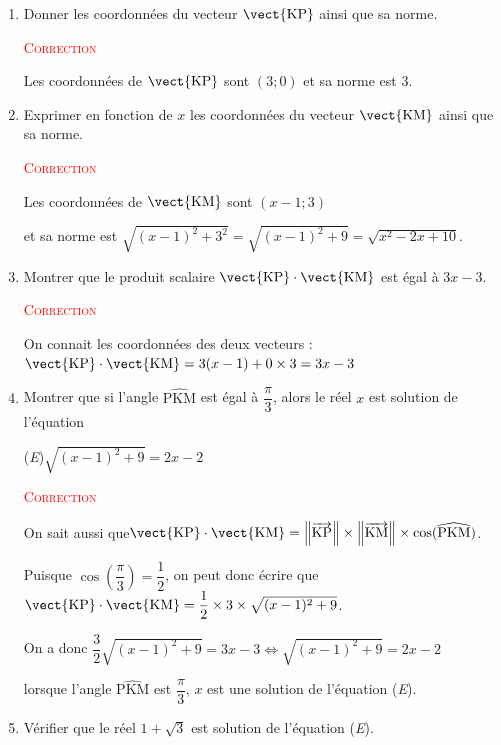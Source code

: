 \begin{enumerate}
	\item Donner les coordonnées du vecteur \mbox{$\vect{\text{KP}}$} ainsi que sa norme.


	\textcolor{red}{\textsc{Correction}}


	Les coordonnées de $\vect{\text{KP}}$ sont 	\mbox{$(3;0)$}
	 et sa norme est $3$.
	\item Exprimer en fonction de $x$ les coordonnées du vecteur \mbox{$\vect{\text{KM}}$} ainsi que sa norme.




	\textcolor{red}{\textsc{Correction}}


	Les coordonnées de $\vect{\text{KM}}$ sont \mbox{$(x-1;3)$}

	et sa norme est \quad \mbox{$\sqrt{(x-1)^2+3^2}=\sqrt{(x-1)^2+9}=\sqrt{x^2-2x+10}$}.

	\item Montrer que le produit scalaire \mbox{$\vect{\text{KP}}\cdot\vect{\text{KM}}$} est égal à \mbox{$3x-3$.}

		\textcolor{red}{\textsc{Correction}}

		On connait les coordonnées des deux vecteurs : \quad \mbox{$\vect{\text{KP}}\cdot\vect{\text{KM}}=3(x-1)+0\times3=3x-3$}
	\item Montrer que si l'angle \ensuremath{\widehat{\text{PKM}}} est égal à \mbox{$\dfrac\pi 3$}, alors le réel $x$ est solution de l'équation

	\begin{center}
		(\textit{E})\hspace{10mm}\mbox{$\sqrt{(x-1)^2+9}=2x-2$}
	\end{center}



	\textcolor{red}{\textsc{Correction}}

	On sait aussi que\quad  \mbox{$\vect{\text{KP}}\cdot\vect{\text{KM}}=\left\|\overrightarrow{\text{KP}}\right\|\times\left\|\overrightarrow{\text{KM}}\right\|\times \cos(\widehat{\text{PKM}})$}.

	Puisque \quad \mbox{$\cos\left(\dfrac\pi 3\right)=\dfrac12$}, \quad on peut donc écrire que \quad \mbox{$\vect{\text{KP}}\cdot\vect{\text{KM}}=\dfrac12\times3\times\sqrt{(x-1)^2+9}$.}

	On a donc \quad \mbox{$\dfrac32 \sqrt{(x-1)^2+9}=3x-3\iff \sqrt{(x-1)^2+9}=2x-2$}

	lorsque l'angle \ensuremath{\widehat{\text{PKM}}} est \mbox{$\dfrac\pi 3$}, $x$ est une solution de l'équation (\textit{E}).
	\item Vérifier que le réel \mbox{$1+\sqrt3$} est solution de l'équation (\textit{E}).


\end{enumerate}
